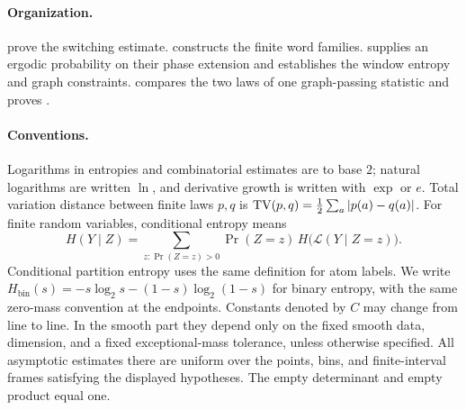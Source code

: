 \paragraph{Organization.}
 prove the switching
estimate.  constructs the finite word families.
 supplies an ergodic probability on their phase
extension and establishes the window entropy and graph constraints.
 compares the two laws of one graph-passing
statistic and proves .

\paragraph{Conventions.}
Logarithms in entropies and combinatorial estimates are to base $2$;
natural logarithms are written $\ln$, and derivative growth is written
with $\exp$ or $e$. Total variation distance between finite laws $p,q$
is $\operatorname{TV}(p,q)=\tfrac12\sum_a|p(a)-q(a)|$.
For finite random variables, conditional entropy means
\[
 H(Y\mid Z)=\sum_{z:\Pr(Z=z)>0}\Pr(Z=z)\,
 H\bigl(\mathcal L(Y\mid Z=z)\bigr).
\]
Conditional partition entropy uses the same definition for atom labels.
We write $H_{\mathrm{bin}}(s)=-s\log_2 s-(1-s)\log_2(1-s)$
for binary entropy, with the same zero-mass convention at the endpoints.
Constants denoted by $C$ may change from line to line.
In the smooth part they depend only on the fixed smooth data,
dimension, and a fixed exceptional-mass tolerance, unless otherwise
specified. All asymptotic estimates there are uniform over the
points, bins, and finite-interval frames satisfying the displayed
hypotheses. The empty determinant and empty product equal one.
